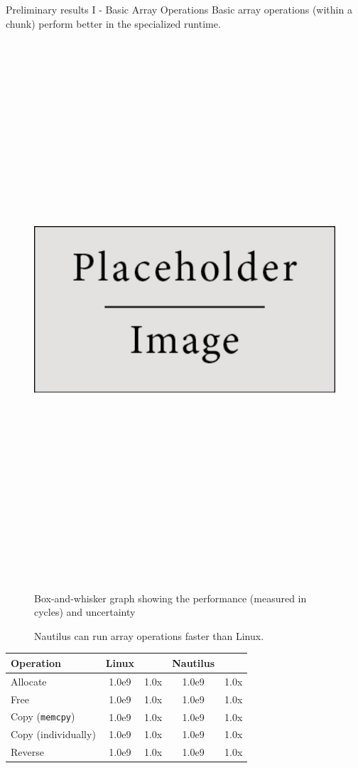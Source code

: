 \begin{block}{Preliminary results I - Basic Array Operations}
  Basic array operations (within a chunk) perform better in the specialized runtime.

  \begin{figure}
    \includegraphics[height=20cm]{place_holder.png}

    Box-and-whisker graph showing the performance (measured in cycles) and uncertainty
    \caption{Nautilus can run array operations faster than Linux.}
  \end{figure}

  \begin{table}
    \begin{tabular}{l || c c | c c}
      Operation & Linux & & Nautilus & \\
      \hline\hline
      Allocate & 1.0e9 & 1.0x & 1.0e9 & 1.0x \\\hline
      Free & 1.0e9 & 1.0x & 1.0e9 & 1.0x \\\hline
      Copy (\texttt{memcpy}) & 1.0e9 & 1.0x & 1.0e9 & 1.0x \\\hline
      Copy (individually) & 1.0e9 & 1.0x & 1.0e9 & 1.0x \\\hline
      Reverse & 1.0e9 & 1.0x & 1.0e9 & 1.0x \\
    \end{tabular}


\end{table}
\end{block}
